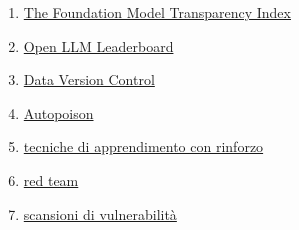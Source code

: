 \documentclass[
]{article}
\begin{document}
\begin{enumerate}
{  Poisoning}
\item
  \href{https://crfm.stanford.edu/fmti/}{The Foundation Model
  Transparency Index}
\item
  \href{https://huggingface.co/spaces/HuggingFaceH4/open_llm_leaderboard}{Open
  LLM Leaderboard}
\item
  \href{https://dvc.org/doc/user-guide/analytics}{Data Version Control}
\item
  \href{https://github.com/azshue/AutoPoison}{Autopoison}
\item
  \href{https://wandb.ai/ayush-thakur/Intro-RLAIF/reports/An-Introduction-to-Training-LLMs-Using-Reinforcement-Learning-From-Human-Feedback-RLHF---VmlldzozMzYyNjcy}{tecniche
  di apprendimento con rinforzo}
\item
  \href{https://www.anthropic.com/index/red-teaming-language-models-to-reduce-harms-methods-scaling-behaviors-and-lessons-learned}{red
  team}
\item
  \href{https://github.com/leondz/garak}{scansioni di vulnerabilità}
\end{enumerate}
\end{document}
